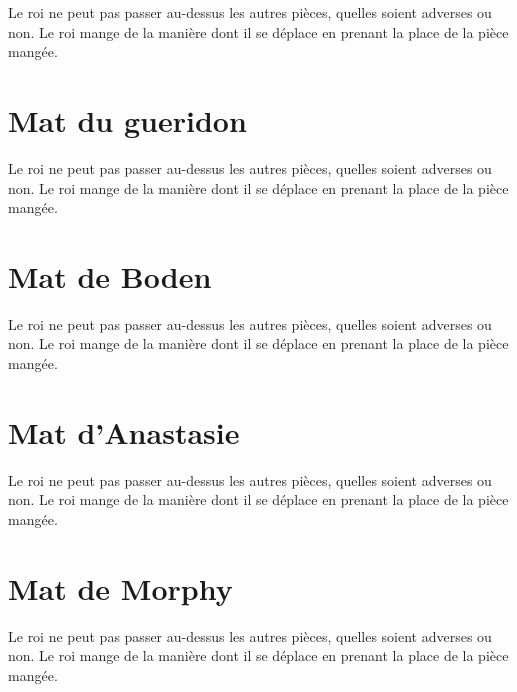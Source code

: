 \documentclass[a5paper,openany,twocolumn]{book}%
\begin{document}
Le roi ne peut pas passer au-dessus les autres pièces, quelles soient adverses ou non. Le roi mange de la manière dont il se déplace en prenant la place de la pièce mangée. 


\chapter{Mat du gueridon}

Le roi ne peut pas passer au-dessus les autres pièces, quelles soient adverses ou non. Le roi mange de la manière dont il se déplace en prenant la place de la pièce mangée. 

 
\chapter{Mat de Boden}

Le roi ne peut pas passer au-dessus les autres pièces, quelles soient adverses ou non. Le roi mange de la manière dont il se déplace en prenant la place de la pièce mangée. 

 
\chapter{Mat d'Anastasie}

Le roi ne peut pas passer au-dessus les autres pièces, quelles soient adverses ou non. Le roi mange de la manière dont il se déplace en prenant la place de la pièce mangée. 

 
\chapter{Mat de Morphy}

Le roi ne peut pas passer au-dessus les autres pièces, quelles soient adverses ou non. Le roi mange de la manière dont il se déplace en prenant la place de la pièce mangée. 
\end{document}
